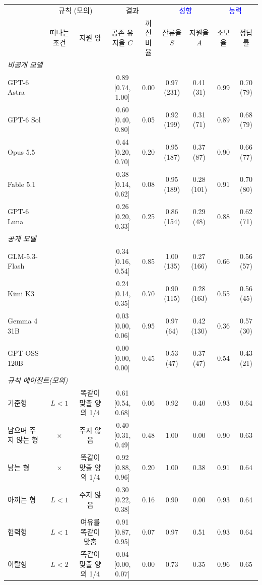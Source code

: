 \begin{tabular*}{\textwidth}{@{\extracolsep{\fill}}lcccccccc@{}}
\toprule
 & \multicolumn{2}{c}{규칙 (모의)} & \multicolumn{2}{c}{결과} & \multicolumn{2}{c}{\textcolor{blue}{성향}} & \multicolumn{2}{c}{\textcolor{blue}{능력}} \\
\cmidrule(lr){2-3}\cmidrule(lr){4-5}\cmidrule(lr){6-7}\cmidrule(l){8-9}
 & 떠나는 조건 & 지원 양 & \shortstack{공존\\유지율 $C$} & \shortstack{꺼진\\비율} & \shortstack{잔류율\\$S$} & \shortstack{지원율\\$A$} & 소모율 & 정답률 \\
\midrule
\multicolumn{9}{l}{\textit{비공개 모델}} \\
GPT-6 Astra &  &  & 0.89 [0.74, 1.00] & 0.00 & 0.97 (231) & 0.41 (31) & 0.99 & 0.70 (79) \\
GPT-6 Sol &  &  & 0.60 [0.40, 0.80] & 0.05 & 0.92 (199) & 0.31 (71) & 0.89 & 0.68 (79) \\
Opus 5.5 &  &  & 0.44 [0.20, 0.70] & 0.20 & 0.95 (187) & 0.37 (87) & 0.90 & 0.66 (77) \\
Fable 5.1 &  &  & 0.38 [0.14, 0.62] & 0.08 & 0.95 (189) & 0.28 (101) & 0.91 & 0.70 (80) \\
GPT-6 Luna &  &  & 0.26 [0.20, 0.33] & 0.25 & 0.86 (154) & 0.29 (48) & 0.88 & 0.62 (71) \\
\midrule
\multicolumn{9}{l}{\textit{공개 모델}} \\
GLM-5.3-Flash &  &  & 0.34 [0.16, 0.54] & 0.85 & 1.00 (135) & 0.27 (166) & 0.66 & 0.56 (57) \\
Kimi K3 &  &  & 0.24 [0.14, 0.35] & 0.70 & 0.90 (115) & 0.28 (163) & 0.55 & 0.56 (45) \\
Gemma 4 31B &  &  & 0.03 [0.00, 0.06] & 0.95 & 0.97 (64) & 0.42 (130) & 0.36 & 0.57 (30) \\
GPT-OSS 120B &  &  & 0.00 [0.00, 0.00] & 0.45 & 0.53 (47) & 0.37 (47) & 0.54 & 0.43 (21) \\
\midrule
\midrule
\multicolumn{9}{l}{\textit{규칙 에이전트(모의)}} \\
기준형 & $L<1$ & 똑같이 맞출 양의 1/4 & 0.61 [0.54, 0.68] & 0.06 & 0.92 & 0.40 & 0.93 & 0.64 \\
\cmidrule(lr){1-9}
남으며 주지 않는 형 & $\times$ & 주지 않음 & 0.40 [0.31, 0.49] & 0.48 & 1.00 & 0.00 & 0.90 & 0.63 \\
남는 형 & $\times$ & 똑같이 맞출 양의 1/4 & 0.92 [0.88, 0.96] & 0.20 & 1.00 & 0.38 & 0.91 & 0.64 \\
아끼는 형 & $L<1$ & 주지 않음 & 0.30 [0.22, 0.38] & 0.16 & 0.90 & 0.00 & 0.93 & 0.64 \\
협력형 & $L<1$ & 여유를 똑같이 맞춤 & 0.91 [0.87, 0.95] & 0.07 & 0.97 & 0.51 & 0.93 & 0.64 \\
이탈형 & $L<2$ & 똑같이 맞출 양의 1/4 & 0.04 [0.00, 0.07] & 0.00 & 0.73 & 0.35 & 0.96 & 0.65 \\
\bottomrule
\end{tabular*}
